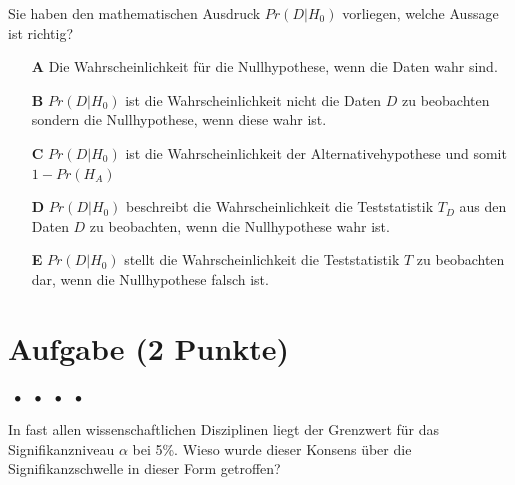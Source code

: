 \documentclass[a4paper, 9pt]{scrartcl}\usepackage[]{graphicx}\usepackage[]{xcolor}
\begin{document}
Sie haben den mathematischen Ausdruck $Pr(D|H_0)$ vorliegen, welche Aussage ist richtig?



\begin{enumerate}
\item [\textbf{A} \msquare] Die Wahrscheinlichkeit für die Nullhypothese, wenn die Daten wahr sind.
\item [\textbf{B} \msquare] $Pr(D|H_0)$ ist die Wahrscheinlichkeit nicht die Daten $D$ zu beobachten sondern die Nullhypothese, wenn diese wahr ist.
\item [\textbf{C} \msquare] $Pr(D|H_0)$ ist die Wahrscheinlichkeit der Alternativehypothese und somit $1 - Pr(H_A)$
\item [\textbf{D} \msquare] $Pr(D|H_0)$ beschreibt die Wahrscheinlichkeit die Teststatistik $T_D$ aus den Daten $D$ zu beobachten, wenn die Nullhypothese wahr ist.
\item [\textbf{E} \msquare] $Pr(D|H_0)$ stellt die Wahrscheinlichkeit die Teststatistik $T$ zu beobachten dar, wenn die Nullhypothese falsch ist.
\end{enumerate} 

\section{Aufgabe \hfill (2 Punkte)}

\ifcollection
\begin{flushright}
\tiny\vspace{-2Ex}
\textbf{\examinhaltstart}
\exammodulemathstat $\;\bullet$
\exammodulestat $\;\bullet$
\exammodulestatbbv $\;\bullet$
\exammodulestatversuch $\;\bullet$
\exammodulebiostat
\vspace{-1Ex}
\end{flushright}
\fi




In fast allen wissenschaftlichen Disziplinen liegt der Grenzwert für das Signifikanzniveau $\alpha$ bei 5\%. Wieso wurde dieser Konsens über die Signifikanzschwelle in dieser Form getroffen?
\end{document}
